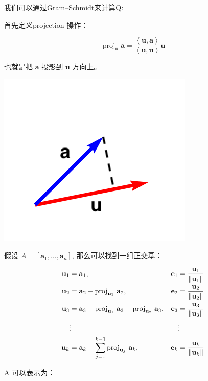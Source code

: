 \documentclass[
]{book}
\begin{document}
我们可以通过Gram--Schmidt来计算Q:

首先定义projection 操作：

\[\operatorname {proj} _{\mathbf {u} }\mathbf {a} ={\frac {\left\langle \mathbf {u} ,\mathbf {a} \right\rangle }{\left\langle \mathbf {u} ,\mathbf {u} \right\rangle }}{\mathbf {u} }\]

也就是把 \(\mathbf{a}\) 投影到 \(\mathbf{u}\) 方向上。

\includegraphics{images/QR_01_proj_v.png}

假设 \(A=\left[\mathbf {a} _{1},\ldots ,\mathbf {a} _{n}\right]\), 那么可以找到一组正交基：

\[
\begin{aligned}
\mathbf {u} _{1}&=\mathbf {a} _{1},&\mathbf {e} _{1}&={\mathbf {u} _{1} \over \|\mathbf {u} _{1}\|}\\\mathbf {u} _{2}&=\mathbf {a} _{2}-\operatorname {proj} _{\mathbf {u} _{1}}\,\mathbf {a} _{2},&\mathbf {e} _{2}&={\mathbf {u} _{2} \over \|\mathbf {u} _{2}\|}\\\mathbf {u} _{3}&=\mathbf {a} _{3}-\operatorname {proj} _{\mathbf {u} _{1}}\,\mathbf {a} _{3}-\operatorname {proj} _{\mathbf {u} _{2}}\,\mathbf {a} _{3},&\mathbf {e} _{3}&={\mathbf {u} _{3} \over \|\mathbf {u} _{3}\|}\\&\vdots &&\vdots \\\mathbf {u} _{k}&=\mathbf {a} _{k}-\sum _{j=1}^{k-1}\operatorname {proj} _{\mathbf {u} _{j}}\,\mathbf {a} _{k},&\mathbf {e} _{k}&={\mathbf {u} _{k} \over \|\mathbf {u} _{k}\|}
\end{aligned}
\]

A 可以表示为：
\end{document}
